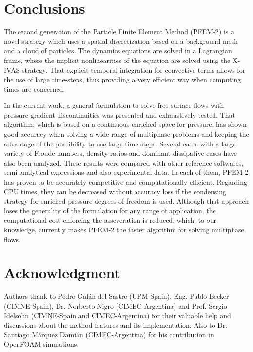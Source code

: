 \documentclass[review]{elsarticle}
\begin{document}





% 


\section{Conclusions}

The second generation of the Particle Finite Element Method (PFEM-2) is a novel strategy which uses a spatial discretization based on a background mesh and a cloud of particles. The dynamics equations are solved in a Lagrangian frame, where the implicit nonlinearities of the equation are solved using the {X-IVAS} strategy. That explicit temporal integration for convective terms allows for the use of large time-steps, thus providing a very efficient way when computing times are concerned.

In the current work, a general formulation to solve free-surface flows with pressure gradient discontinuities was presented and exhaustively tested. That algorithm, which is based on a continuous enriched space for pressure, has shown good accuracy when solving a wide range of multiphase problems and keeping the advantage of the possibility to use large time-steps. Several cases with a large variety of Froude numbers, density ratios and dominant dissipative cases have also been analyzed. These results were compared with other reference softwares, semi-analytical expressions and also experimental data. In each of them, PFEM-2 has proven to be accurately competitive and computationally efficient. Regarding CPU times, they can be decreased without accuracy loss if the condensing strategy for enriched pressure degrees of freedom is used. Although that approach loses the generality of the formulation for any range of application, the computational cost enforcing the asseveration is reduced, which, to our knowledge, currently makes PFEM-2 the faster algorithm for solving multiphase flows.

\section*{Acknowledgment}

Authors thank to Pedro Gal\'an del Sastre (UPM-Spain), Eng. Pablo Becker (CIMNE-Spain), Dr. Norberto Nigro (CIMEC-Argentina) and Prof. Sergio Idelsohn (CIMNE-Spain and CIMEC-Argentina) for their valuable help and discussions about the method features and its implementation. Also to Dr. Santiago M\'arquez Dami\'an (CIMEC-Argentina) for his contribution in OpenFOAM simulations.
\end{document}
